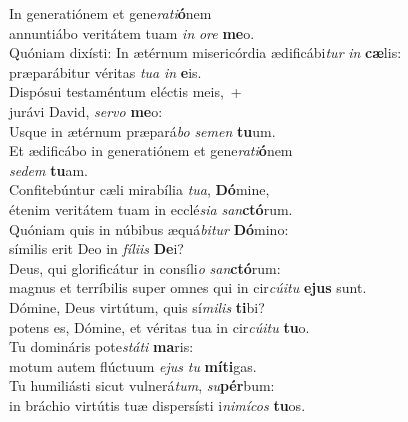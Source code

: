 \evenverse In generatiónem et gene\textit{ra}\textit{ti}\textbf{ó}nem~\*\\
\evenverse annuntiábo veritátem tuam \textit{in} \textit{o}\textit{re} \textbf{me}o.\\
\oddverse Quóniam dixísti: In ætérnum misericórdia ædificábi\textit{tur} \textit{in} \textbf{cæ}lis:~\*\\
\oddverse præparábitur véritas \textit{tu}\textit{a} \textit{in} \textbf{e}is.\\
\evenverse Dispósui testaméntum eléctis meis,~+\\
\evenverse  jurávi David, \textit{ser}\textit{vo} \textbf{me}o:~\*\\
\evenverse Usque in ætérnum præpará\textit{bo} \textit{se}\textit{men} \textbf{tu}um.\\
\oddverse Et ædificábo in generatiónem et gene\textit{ra}\textit{ti}\textbf{ó}nem~\*\\
\oddverse \textit{se}\textit{dem} \textbf{tu}am.\\
\evenverse Confitebúntur cæli mirabília \textit{tu}\textit{a}, \textbf{Dó}mine,~\*\\
\evenverse étenim veritátem tuam in ecclé\textit{si}\textit{a} \textit{san}\textbf{ctó}rum.\\
\oddverse Quóniam quis in núbibus æquá\textit{bi}\textit{tur} \textbf{Dó}mino:~\*\\
\oddverse símilis erit Deo in \textit{fí}\textit{li}\textit{is} \textbf{De}i?\\
\evenverse Deus, qui glorificátur in consíli\textit{o} \textit{san}\textbf{ctó}rum:~\*\\
\evenverse magnus et terríbilis super omnes qui in cir\textit{cú}\textit{i}\textit{tu} \textbf{e}\textbf{jus} sunt.\\
\oddverse Dómine, Deus virtútum, quis sí\textit{mi}\textit{lis} \textbf{ti}bi?~\*\\
\oddverse potens es, Dómine, et véritas tua in cir\textit{cú}\textit{i}\textit{tu} \textbf{tu}o.\\
\evenverse Tu domináris pote\textit{stá}\textit{ti} \textbf{ma}ris:~\*\\
\evenverse motum autem flúctuum \textit{e}\textit{jus} \textit{tu} \textbf{mí}\textbf{ti}gas.\\
\oddverse Tu humiliásti sicut vulnerá\textit{tum}, \textit{su}\textbf{pér}bum:~\*\\
\oddverse in bráchio virtútis tuæ dispersísti i\textit{ni}\textit{mí}\textit{cos} \textbf{tu}os.\\
